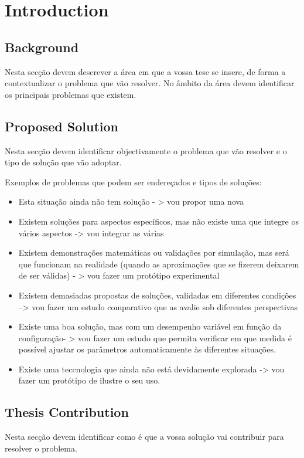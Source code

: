 \chapter{Introduction}\label{introduction}

\section{Background}
Nesta secção devem descrever a área em que a vossa tese se insere, de forma
a contextualizar o problema que vão resolver. No âmbito da área devem
identificar os principais problemas que existem.


\section{Proposed Solution}
Nesta secção devem identificar objectivamente o problema que vão resolver e o
tipo de solução que vão adoptar.

Exemplos de problemas que podem ser endereçados e tipos de soluções:

\begin{itemize}
\item Esta situação ainda não tem solução - > vou propor uma nova
\item Existem soluções para aspectos específicos, mas não existe uma que integre
os vários aspectos -> vou integrar as várias
\item Existem demonstrações matemáticas ou validações por simulação, mas
será que funcionam na realidade (quando as aproximações que se fizerem
deixarem de ser válidas) - > vou fazer um protótipo experimental
\item Existem demasiadas propostas de soluções, validadas em diferentes
condições –> vou fazer um estudo comparativo que as avalie sob diferentes
perspectivas
\item Existe uma boa solução, mas com um desempenho variável em função da
configuração- > vou fazer um estudo que permita verificar em que medida é
possível ajustar os parâmetros automaticamente às diferentes situações.
\item Existe uma teccnologia que ainda não está devidamente explorada -> vou
fazer um protótipo de ilustre o seu uso.
\end{itemize}

\section{Thesis Contribution}
Nesta secção devem identificar como é que a vossa solução vai contribuir para
resolver o problema.


